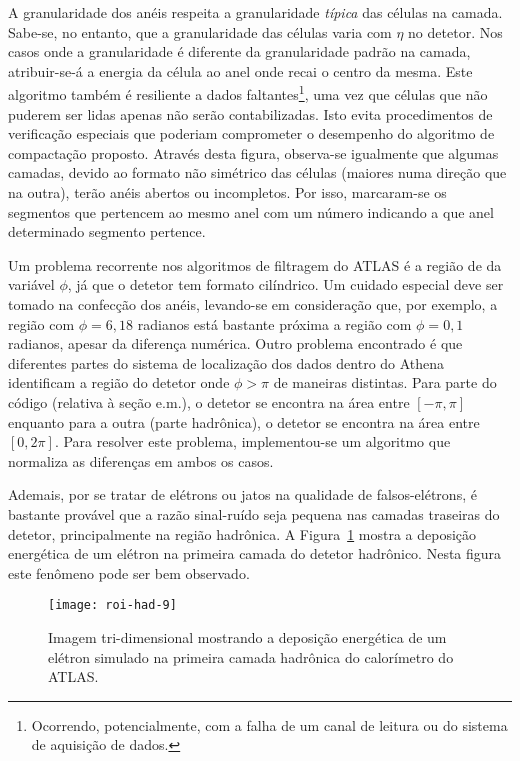 A granularidade dos anéis respeita a granularidade \emph{típica} das células
na camada. Sabe-se, no entanto, que a granularidade das células varia com
$\eta$ no detetor. Nos casos onde a granularidade é diferente da granularidade
padrão na camada, atribuir-se-á a energia da célula ao anel onde recai o
centro da mesma. Este algoritmo também é resiliente a dados
faltantes\footnote{Ocorrendo, potencialmente, com a falha de um canal de
leitura ou do sistema de aquisição de dados.}, uma vez que células que não
puderem ser lidas apenas não serão contabilizadas. Isto evita procedimentos de
verificação especiais que poderiam comprometer o desempenho do algoritmo de
compactação proposto. Através desta figura, observa-se igualmente que algumas
camadas, devido ao formato não simétrico das células (maiores numa direção que
na outra), terão anéis abertos ou incompletos. Por isso, marcaram-se os
segmentos que pertencem ao mesmo anel com um número indicando a que anel
determinado segmento pertence.

Um problema recorrente nos algoritmos de filtragem do ATLAS é a região de
 da variável $\phi$, já que o detetor tem formato
cilíndrico. Um cuidado especial deve ser tomado na confecção dos anéis,
levando-se em consideração que, por exemplo, a região com $\phi = 6,18$
radianos está bastante próxima a região com $\phi = 0,1$ radianos, apesar da
diferença numérica. Outro problema encontrado é que diferentes partes do
sistema de localização dos dados dentro do Athena identificam a região do
detetor onde $\phi > \pi$ de maneiras distintas. Para parte do código
(relativa à seção e.m.), o detetor se encontra na área entre $[-\pi, \pi]$
enquanto para a outra (parte hadrônica), o detetor se encontra na área entre
$[0, 2\pi]$. Para resolver este problema, implementou-se um algoritmo que
normaliza as diferenças em ambos os casos.

Ademais, por se tratar de elétrons ou jatos na qualidade de falsos-elétrons, é
bastante provável que a razão sinal-ruído seja pequena nas camadas traseiras
do detetor, principalmente na região hadrônica. A Figura~\ref{fig:roi-had-9}
mostra a deposição energética de um elétron na primeira camada do detetor
hadrônico. Nesta figura este fenômeno pode ser bem observado.

\begin{figure}
\begin{center}
\texttt{[image: roi-had-9]}
\end{center}
\caption{Imagem tri-dimensional mostrando a deposição energética de
um elétron simulado na primeira camada hadrônica do calorímetro do ATLAS.}
\label{fig:roi-had-9}
\end{figure}

